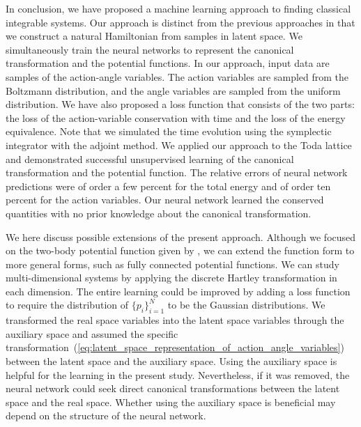 
In conclusion, we have proposed a machine learning approach to finding classical integrable systems.
Our approach is distinct from the previous approaches in that we construct a natural Hamiltonian from samples in latent space.
We simultaneously train the neural networks to represent the canonical transformation and the potential functions.
In our approach, input data are samples of the action-angle variables.
The action variables are sampled from the Boltzmann distribution, and the angle variables are sampled from the uniform distribution.
We have also proposed a loss function that consists of the two parts: the loss of the action-variable conservation with time and the loss of the energy equivalence.
Note that we simulated the time evolution using the symplectic integrator with the adjoint method.
We applied our approach to the Toda lattice and demonstrated successful unsupervised learning of the canonical transformation and the potential function.
The relative errors of neural network predictions were of order a few percent for the total energy and of order ten percent for the action variables.
Our neural network learned the conserved quantities with no prior knowledge about the canonical transformation.

We here discuss possible extensions of the present approach.
Although we focused on the two-body potential function given by , we can extend the function form to more general forms, such as fully connected potential functions.
We can study multi-dimensional systems by applying the discrete Hartley transformation in each dimension.
The entire learning could be improved by adding a loss function to require the distribution of $\{p_i\}_{i=1}^{N}$ to be the Gaussian distributions.
We transformed the real space variables into the latent space variables through the auxiliary space and assumed the specific transformation~(\ref{eq:latent_space_representation_of_action_angle_variables}) between the latent space and the auxiliary space.
Using the auxiliary space is helpful for the learning in the present study.
Nevertheless, if it was removed, the neural network could seek direct canonical transformations between the latent space and the real space.
Whether using the auxiliary space is beneficial may depend on the structure of the neural network.

